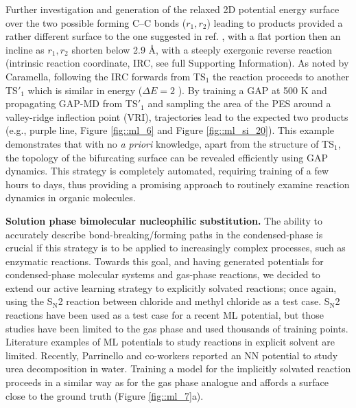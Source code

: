 \documentclass[../../main.tex]{subfiles}
\begin{document}
Further investigation and generation of the relaxed 2D potential energy surface over the two possible forming C–C bonds ($r_1, r_2$) leading to products provided a rather different surface to the one suggested in ref. \cite{Caramella2002}, with a flat portion then an incline as $r_1, r_2$ shorten below 2.9 \AA, with a steeply exergonic reverse reaction (intrinsic reaction coordinate, IRC, see full Supporting Information). As noted by Caramella, following the IRC forwards from TS${}_1$ the reaction proceeds to another TS${}'_1$ which is similar in energy ($\Delta E = 2$ \kcal). By training a GAP at 500 K and propagating GAP-MD from TS${}'_1$ and sampling the area of the PES around a valley-ridge inflection point (VRI), trajectories lead to the expected two products (e.g., purple line, Figure \ref{fig::ml_6} and Figure \ref{fig::ml_si_20}). This example demonstrates that with no \emph{a priori} knowledge, apart from the structure of TS${}_1$, the topology of the bifurcating surface can be revealed efficiently using GAP dynamics. This strategy is completely automated, requiring training of a few hours to days, thus providing a promising approach to routinely examine reaction dynamics in organic molecules.


{\bfseries{Solution phase bimolecular nucleophilic substitution.}} The ability to accurately describe bond-breaking/forming paths in the condensed-phase is crucial if this strategy is to be applied to increasingly complex processes, such as enzymatic reactions. Towards this goal, and having generated potentials for condensed-phase molecular systems and gas-phase reactions, we decided to extend our active learning strategy to explicitly solvated reactions; once again, using the S${}_\text{N}$2 reaction between chloride and methyl chloride as a test case. S${}_\text{N}$2 reactions have been used as a test case for a recent ML potential, but those studies have been limited to the gas phase and used thousands of training points.\cite{Unke2019} Literature examples of ML potentials to study reactions in explicit solvent are limited. Recently, Parrinello and co-workers reported an NN potential to study urea decomposition in water.\cite{Yang2021} Training a model for the implicitly solvated reaction proceeds in a similar way as for the gas phase analogue and affords a surface close to the ground truth (Figure \ref{fig::ml_7}a).
\end{document}
